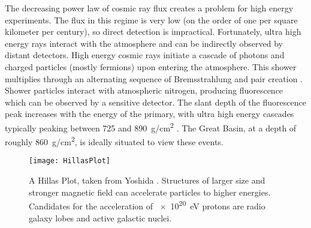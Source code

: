 The decreasing power law of cosmic ray flux creates a problem for high energy experiments. The flux in this regime is very low (on the order of one per square kilometer per century), so direct detection is impractical. Fortunately, ultra high energy rays interact with the atmosphere and can be indirectly observed by distant detectors. High energy cosmic rays initiate a cascade of photons and charged particles (mostly fermions) upon entering the atmosphere. This shower multiplies through an alternating sequence of Bremsstrahlung and pair creation \cite{abuzayyad2000hires}. Shower particles interact with atmospheric nitrogen, producing fluorescence which can be observed by a sensitive detector. The slant depth of the fluorescence peak increases with the energy of the primary, with ultra high energy cascades typically peaking between \num{725} and \SI{890}{g/cm^2} \cite{abuzayyad2000hires}. The Great Basin, at a depth of roughly \SI{860}{g/cm^2}, is ideally situated to view these events.

\begin{figure}[ht]
    \label{fig:hillas}
    \centering
    \texttt{[image: HillasPlot]}
    \caption{A Hillas Plot, taken from Yoshida \cite{yoshida1998uhecr}. Structures of larger size and stronger magnetic field can accelerate particles to higher energies. Candidates for the acceleration of \SI{e20}{eV} protons are radio galaxy lobes and active galactic nuclei.}
\end{figure}

